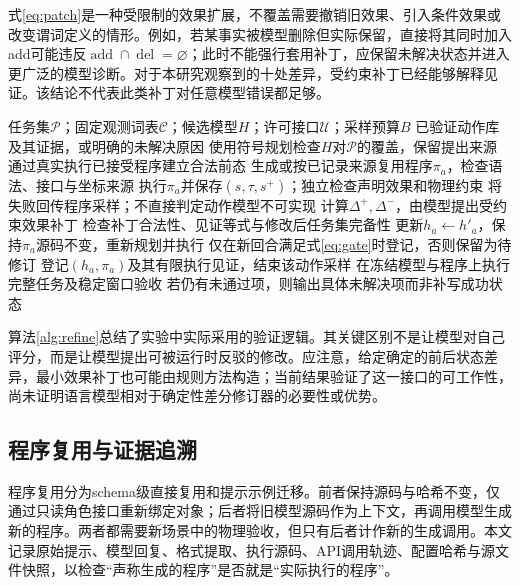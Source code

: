 \documentclass[UTF8,zihao=-4,fontset=fandol,a4paper]{ctexart}
\newcommand{\C}{\mathcal{C}}
\newcommand{\Pset}{\mathcal{P}}
\newcommand{\add}{\operatorname{add}}
\newcommand{\del}{\operatorname{del}}
\begin{document}
式\eqref{eq:patch}是一种受限制的效果扩展，不覆盖需要撤销旧效果、引入条件效果或改变谓词定义的情形。例如，若某事实被模型删除但实际保留，直接将其同时加入add可能违反$\add\cap\del=\varnothing$；此时不能强行套用补丁，应保留未解决状态并进入更广泛的模型诊断。对于本研究观察到的十处差异，受约束补丁已经能够解释见证。该结论不代表此类补丁对任意模型错误都足够。

\begin{algorithm}[htbp]
\caption{执行见证约束的模型效果修订与复验}
\label{alg:refine}
\begin{algorithmic}[1]
\Require 任务集$\Pset$；固定观测词表$\C$；候选模型$H$；许可接口$\mathcal{U}$；采样预算$B$
\Ensure 已验证动作库及其证据，或明确的未解决原因
\State 使用符号规划检查$H$对$\Pset$的覆盖，保留提出来源
  \State 通过真实执行已接受程序建立合法前态
    \State 生成或按已记录来源复用程序$\pi_a$，检查语法、接口与坐标来源
    \State 执行$\pi_a$并保存$(s,\tau,s^{+})$；独立检查声明效果和物理约束
      \State 将失败回传程序采样；不直接判定动作模型不可实现
      \State 计算$\Delta^{+},\Delta^{-}$，由模型提出受约束效果补丁
      \State 检查补丁合法性、见证等式与修改后任务集完备性
        \State 更新$h_a\leftarrow h'_a$，保持$\pi_a$源码不变，重新规划并执行
        \State 仅在新回合满足式\eqref{eq:gate}时登记，否则保留为待修订
      \EndIf
    \Else
      \State 登记$(h_a,\pi_a)$及其有限执行见证，结束该动作采样
    \EndIf
  \EndFor
\EndFor
\State 在冻结模型与程序上执行完整任务及稳定窗口验收
\State 若仍有未通过项，则输出具体未解决项而非补写成功状态
\end{algorithmic}
\end{algorithm}

算法\ref{alg:refine}总结了实验中实际采用的验证逻辑。其关键区别不是让模型对自己评分，而是让模型提出可被运行时反驳的修改。应注意，给定确定的前后状态差异，最小效果补丁也可能由规则方法构造；当前结果验证了这一接口的可工作性，尚未证明语言模型相对于确定性差分修订器的必要性或优势。

\subsection{程序复用与证据追溯}
程序复用分为schema级直接复用和提示示例迁移。前者保持源码与哈希不变，仅通过只读角色接口重新绑定对象；后者将旧模型源码作为上下文，再调用模型生成新的程序。两者都需要新场景中的物理验收，但只有后者计作新的生成调用。本文记录原始提示、模型回复、格式提取、执行源码、API调用轨迹、配置哈希与源文件快照，以检查“声称生成的程序”是否就是“实际执行的程序”。
\end{document}
